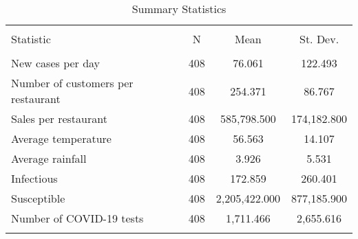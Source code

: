 
\begin{table}[H] \centering 
  \caption{Summary Statistics} 
  \label{} 
\begin{tabular}{@{\extracolsep{5pt}}lccc} 
\\[-1.8ex]\hline 
\hline \\[-1.8ex] 
Statistic & \multicolumn{1}{c}{N} & \multicolumn{1}{c}{Mean} & \multicolumn{1}{c}{St. Dev.} \\ 
\hline \\[-1.8ex] 
New cases per day & 408 & 76.061 & 122.493 \\ 
Number of customers per restaurant & 408 & 254.371 & 86.767 \\ 
Sales per restaurant & 408 & 585,798.500 & 174,182.800 \\ 
Average temperature & 408 & 56.563 & 14.107 \\ 
Average rainfall & 408 & 3.926 & 5.531 \\ 
Infectious & 408 & 172.859 & 260.401 \\ 
Susceptible & 408 & 2,205,422.000 & 877,185.900 \\ 
Number of COVID-19 tests & 408 & 1,711.466 & 2,655.616 \\ 
\hline \\[-1.8ex] 
\end{tabular} 
\end{table} 
